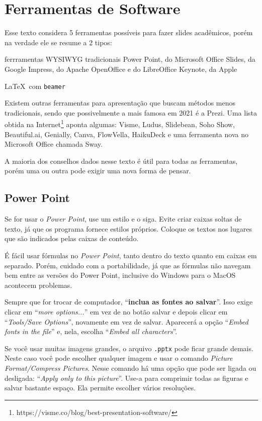 \section{Ferramentas de Software}
\label{sec:ferramentas}

Esse texto considera 5 ferramentas possíveis para fazer slides acadêmicos, porém na verdade ele se resume a 2 tipos:
\begin{outline}
    \1 ferrramentas WYSIWYG tradicionais
    \2 Power Point, do Microsoft Office
    \2 Slides, da Google
    \2 Impress, do Apache OpenOffice e do LibreOffice
    \2 Keynote, da Apple
    \item \LaTeX\  com \texttt{beamer}
\end{outline}

Existem outras ferramentas para apresentação que buscam métodos menos tradicionais, sendo que possivelmente a mais famosa em 2021 é a Prezi. Uma lista obtida na Internet\footnote{https://visme.co/blog/best-presentation-software/} aponta algumas: Visme, Ludus, Slidebean, Soho Show, Beautiful.ai, Genially, Canva, FlowVella, HaikuDeck e uma ferramenta nova no Microsoft Office chamada Sway.

A maioria dos conselhos dados nesse texto é útil para todas as ferramentas, porém uma ou outra pode exigir uma nova forma de pensar.

\subsection{Power Point}

Se for usar o \textit{Power Point}, use um estilo e o siga. Evite criar caixas soltas de texto, já que os programa fornece estilos próprios. Coloque os textos nos lugares que são indicados pelas caixas de conteúdo.

É fácil usar fórmulas no \textit{Power Point}, tanto dentro do texto quanto em caixas em separado. Porém, cuidado com a portabilidade, já que as fórmulas não navegam bem entre as versões do Power Point, inclusive do Windows para o MacOS acontecem problemas.

Sempre que for trocar de computador, ``\textbf{inclua as fontes ao salvar}''. Isso exige clicar em ``\textit{more options...}'' em vez de no botão salvar e depois clicar em ``\textit{Tools/Save Options}'', novamente em vez de salvar. Aparecerá a opção ``\textit{Embed fonts in the file}'' e, nela, escolha ``\textit{Embed all characters}''.

Se você usar muitas imagens grandes, o arquivo \texttt{.pptx} pode ficar grande demais. Neste caso você pode escolher qualquer imagem e usar o comando \textit{Picture Format/Compress Pictures}. Nesse comando há uma opção que pode ser ligada ou desligada: ``\textit{Apply only to this picture}''. Use-a para comprimir todas as figuras e salvar bastante espaço. Ela permite escolher vários resoluções.

